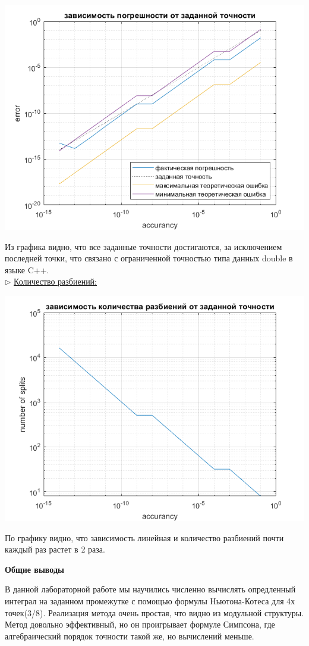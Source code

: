 \documentclass{article}
\begin{document}
	\begin{center} \includegraphics[scale = 0.7]{Погрешность} \end{center}
	Из графика видно, что все заданные точности достигаются, за исключением последней точки, что связано с ограниченной точностью типа данных double в языке C++.\\
	\newpage
	$\triangleright$ \underline{Количество разбиений:}\\
	\begin{center} \includegraphics[scale = 0.7]{Количество разбиений} \end{center}
	По графику видно, что зависимость линейная и количество разбиений почти каждый раз растет в 2 раза.
	\begin{center} \textbf{Общие выводы}\end{center}
	В данной лабораторной работе мы научились численно вычислять опредленный интеграл на заданном промежутке с помощью формулы Ньютона-Котеса для 4х точек(3/8). Реализация метода очень простая, что видно из модульной структуры. Метод довольно эффективный, но он проигрывает формуле Симпсона, где алгебраический порядок точности такой же, но вычислений меньше. 
\end{document}
